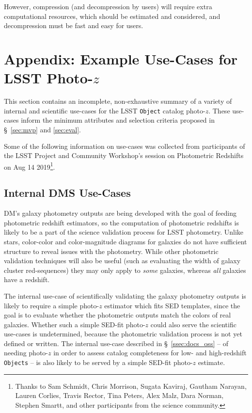 \documentclass[DM,lsstdraft,toc]{lsstdoc}
\begin{document}
However, compression (and decompression by users) will require extra computational resources, which should be estimated and considered, and decompression must be fast and easy for users.


\clearpage
\section{Appendix: Example Use-Cases for LSST Photo-$z$} \label{sec:use}

This section contains an incomplete, non-exhaustive summary of a variety of internal and scientific use-cases for the LSST {\tt Object} catalog photo-$z$.
These use-cases inform the minimum attributes and selection criteria proposed in \S~\ref{sec:mvp} and \ref{sec:eval}. 

Some of the following information on use-cases was collected from participants of the LSST Project and Community Workshop's session on Photometric Redshifts on Aug 14 2019\footnote{Thanks to Sam Schmidt, Chris Morrison, Sugata Kaviraj, Gautham Narayan, Lauren Corlies, Travis Rector, Tina Peters, Alex Malz, Dara Norman, Stephen Smartt, and other participants from the science community.}.

\subsection{Internal DMS Use-Cases}\label{ssec:use_dm}

DM's galaxy photometry outputs are being developed with the goal of feeding photometric redshift estimators, so the computation of photometric redshifts is likely to be a part of the science validation process for LSST photometry. 
Unlike stars, color-color and color-magnitude diagrams for galaxies do not have sufficient structure to reveal issues with the photometry.
While other photometric validation techniques will also be useful (such as evaluating the width of galaxy cluster red-sequences) they may only apply to {\it some} galaxies, whereas {\it all} galaxies have a redshift. 

The internal use-case of scientifically validating the galaxy photometry outputs is likely to require a simple photo-$z$ estimator which fits SED templates, since the goal is to evaluate whether the photometric outputs match the colors of real galaxies.
Whether such a simple SED-fit photo-$z$ could also serve the scientific use-cases is undetermined, because the photometric validation process is not yet defined or written.
The internal use-case described in \S~\ref{ssec:docs_oss} -- of needing photo-$z$ in order to assess catalog completeness for low- and high-redshift {\tt Objects} -- is also likely to be served by a simple SED-fit photo-$z$ estimate.
\end{document}
